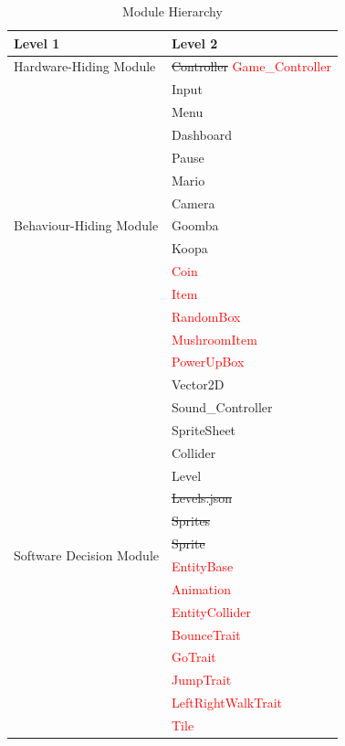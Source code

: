 \documentclass[12pt, titlepage]{article}
\begin{document}
\begin{table}[h!]
\centering
\begin{tabular}{p{} p{}}
\toprule
\textbf{Level 1} & \textbf{Level 2}\\
\midrule

{Hardware-Hiding Module} & \sout{Controller} \textcolor{red}{Game\_Controller} \\
\midrule

\multirow{13}{0.3\textwidth}{Behaviour-Hiding Module} & Input\\
& Menu \\
& Dashboard\\
& Pause\\
& Mario\\
& Camera\\
& Goomba \\
& Koopa \\
& \textcolor{red}{Coin} \\
& \textcolor{red}{Item} \\
& \textcolor{red}{RandomBox} \\
& \textcolor{red}{MushroomItem} \\
& \textcolor{red}{PowerUpBox} \\
\midrule

\multirow{16}{0.3\textwidth}{Software Decision Module} & Vector2D\\
& Sound\_Controller\\
& SpriteSheet\\
& Collider\\
& Level\\
& \sout{Levels.json}\\
& \sout{Sprites} \\
& \sout{Sprite}\\
& \textcolor{red}{EntityBase} \\
& \textcolor{red}{Animation} \\
& \textcolor{red}{EntityCollider} \\
& \textcolor{red}{BounceTrait} \\
& \textcolor{red}{GoTrait} \\
& \textcolor{red}{JumpTrait} \\
& \textcolor{red}{LeftRightWalkTrait} \\
& \textcolor{red}{Tile} \\
\bottomrule

\end{tabular}
\caption{Module Hierarchy}
\label{TblMH}
\end{table}
\end{document}

